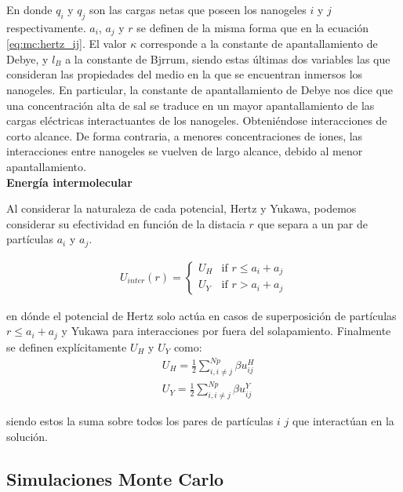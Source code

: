 	\noindent En donde $q_i$ y $q_j$ son las cargas netas que poseen los nanogeles $i$ y $j$ respectivamente. $a_i$, $a_j$ y $r$ se definen de la misma forma que en la ecuaci\'on \ref{eq:mc:hertz_ij}. El valor $\kappa$ corresponde a la constante de apantallamiento de Debye, y $l_B$ a la constante de Bjrrum, siendo estas \'ultimas dos variables las que consideran las propiedades del medio en la que se encuentran inmersos los nanogeles. 
	En particular, la constante de apantallamiento de Debye nos dice que una concentraci\'on alta de sal se traduce en un mayor apantallamiento de las cargas el\'ectricas interactuantes de los nanogeles.  Obteni\'endose interacciones de corto alcance.
	De forma contraria, a menores concentraciones de iones, las interacciones entre nanogeles se vuelven de largo alcance, debido al menor apantallamiento.\\
	
	\textbf{Energ\'ia intermolecular}
	
	Al considerar la naturaleza de cada potencial, Hertz y Yukawa, podemos considerar su efectividad en funci\'on de la distacia $r$ que separa a un par de part\'iculas $a_i$ y $a_j$.
	
	\begin{align}
		U_{inter}(r) = \begin{cases} U_H  & \text{if } r \leq a_i + a_j \\ U_Y & \text{if } r > a_i + a_j \end{cases} 
		\label{eq:mc:HY-potential}
	\end{align}
	
	\noindent en d\'onde el potencial de Hertz solo act\'ua en casos de superposici\'on de part\'iculas $r \leq a_i + a_j$ y Yukawa para interacciones por fuera del solapamiento.
	Finalmente se definen expl\'icitamente $U_H$ y $U_Y$ como:
	\begin{align}
		& U_H =\frac{1}{2} \sum^{Np}_{i,i \neq j} \beta u^H_{ij} \\
		& U_Y = \frac{1}{2} \sum^{Np}_{i,i \neq j} \beta u^Y_{ij}
	\end{align}
	
	\noindent siendo estos la suma sobre todos los pares de part\'iculas $i$ $j$ que interact\'uan en la soluci\'on.
	
	
	\subsection{Simulaciones Monte Carlo} \label{sec:mc:mc}
	
